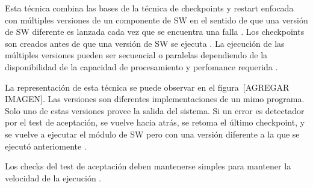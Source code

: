 Esta técnica combina las bases de la técnica de checkpoints y restart enfocada con múltiples 
versiones de un componente de \ac{SW} en el sentido de que una versión de \ac{SW} diferente es 
lanzada cada vez que se encuentra una falla \citep{SoftwareFaultToleranceATutorial}. Los 
checkpoints son creados antes de que una versión de \ac{SW} se ejecuta 
\citep{SoftwareFaultToleranceATutorial}. La ejecución de las múltiples versiones pueden ser 
secuencial o paralelas dependiendo de la disponibilidad de la capacidad de procesamiento y 
perfomance requerida \citep{SoftwareFaultToleranceATutorial}.

La representación de esta técnica se puede observar en el figura~[AGREGAR IMAGEN]. Las 
versiones son diferentes implementaciones de un mimo programa. Solo uno de estas versiones provee 
la salida del sistema. Si un error es detectador por el test de aceptación, se vuelve hacia atrás, 
se retoma el último checkpoint, y se vuelve a ejecutar el módulo de \ac{SW} pero con una 
versión diferente a la que se ejecutó anteriomente \citep{FTDesign}.  	

Los checks del test de aceptación deben mantenerse simples para mantener la velocidad de la 
ejecución \citep{FTDesign}.

